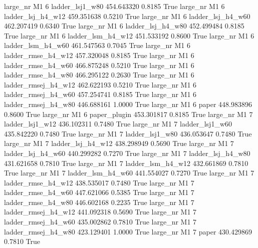   large_nr       M1                 6     ladder_lsj1_w80  454.643320      0.8185    True
  large_nr       M1                 6   ladder_lsj_h4_w12  459.351638      0.5210    True
  large_nr       M1                 6   ladder_lsj_h4_w60  462.207419      0.6340    True
  large_nr       M1                 6   ladder_lsj_h4_w80  452.499484      0.8185    True
  large_nr       M1                 6   ladder_lsm_h4_w12  451.533192      0.8600    True
  large_nr       M1                 6   ladder_lsm_h4_w60  461.547563      0.7045    True
  large_nr       M1                 6  ladder_rmse_h4_w12  457.320048      0.8185    True
  large_nr       M1                 6  ladder_rmse_h4_w60  466.875248      0.5210    True
  large_nr       M1                 6  ladder_rmse_h4_w80  466.295122      0.2630    True
  large_nr       M1                 6 ladder_rmsej_h4_w12  462.622193      0.5210    True
  large_nr       M1                 6 ladder_rmsej_h4_w60  457.254741      0.8185    True
  large_nr       M1                 6 ladder_rmsej_h4_w80  446.688161      1.0000    True
  large_nr       M1                 6               paper  448.983896      0.8600    True
  large_nr       M1                 6        paper_plugin  453.301817      0.8185    True
  large_nr       M1                 7     ladder_lsj1_w12  436.102311      0.7480    True
  large_nr       M1                 7     ladder_lsj1_w60  435.842220      0.7480    True
  large_nr       M1                 7     ladder_lsj1_w80  436.053647      0.7480    True
  large_nr       M1                 7   ladder_lsj_h4_w12  438.298949      0.5690    True
  large_nr       M1                 7   ladder_lsj_h4_w60  440.299282      0.7270    True
  large_nr       M1                 7   ladder_lsj_h4_w80  431.621658      0.7810    True
  large_nr       M1                 7   ladder_lsm_h4_w12  432.661869      0.7810    True
  large_nr       M1                 7   ladder_lsm_h4_w60  441.554027      0.7270    True
  large_nr       M1                 7  ladder_rmse_h4_w12  438.535017      0.7480    True
  large_nr       M1                 7  ladder_rmse_h4_w60  447.621066      0.5385    True
  large_nr       M1                 7  ladder_rmse_h4_w80  446.602168      0.2235    True
  large_nr       M1                 7 ladder_rmsej_h4_w12  441.092318      0.5690    True
  large_nr       M1                 7 ladder_rmsej_h4_w60  435.002862      0.7810    True
  large_nr       M1                 7 ladder_rmsej_h4_w80  423.129401      1.0000    True
  large_nr       M1                 7               paper  430.429869      0.7810    True
